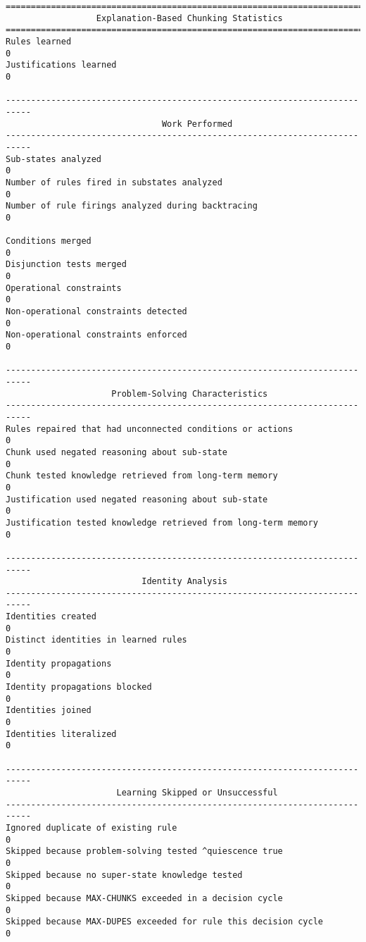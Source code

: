 \begin{center}
{\small
\begin{verbatim}
===========================================================================
                  Explanation-Based Chunking Statistics
===========================================================================
Rules learned                                                          0
Justifications learned                                                 0

---------------------------------------------------------------------------
                               Work Performed
---------------------------------------------------------------------------
Sub-states analyzed                                                    0
Number of rules fired in substates analyzed                            0
Number of rule firings analyzed during backtracing                     0

Conditions merged                                                      0
Disjunction tests merged                                               0
Operational constraints                                                0
Non-operational constraints detected                                   0
Non-operational constraints enforced                                   0

---------------------------------------------------------------------------
                     Problem-Solving Characteristics
---------------------------------------------------------------------------
Rules repaired that had unconnected conditions or actions              0
Chunk used negated reasoning about sub-state                           0
Chunk tested knowledge retrieved from long-term memory                 0
Justification used negated reasoning about sub-state                   0
Justification tested knowledge retrieved from long-term memory         0

---------------------------------------------------------------------------
                           Identity Analysis
---------------------------------------------------------------------------
Identities created                                                     0
Distinct identities in learned rules                                   0
Identity propagations                                                  0
Identity propagations blocked                                          0
Identities joined                                                      0
Identities literalized                                                 0

---------------------------------------------------------------------------
                      Learning Skipped or Unsuccessful
---------------------------------------------------------------------------
Ignored duplicate of existing rule                                     0
Skipped because problem-solving tested ^quiescence true                0
Skipped because no super-state knowledge tested                        0
Skipped because MAX-CHUNKS exceeded in a decision cycle                0
Skipped because MAX-DUPES exceeded for rule this decision cycle        0
\end{verbatim}
}
\end{center}


